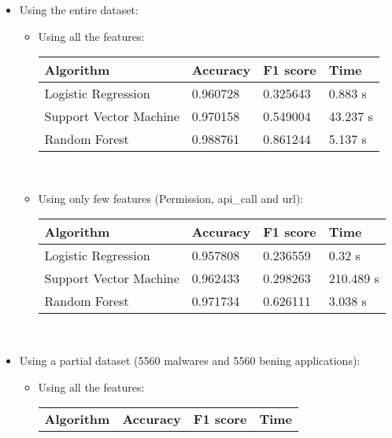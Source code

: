 \documentclass[11pt]{article}
\begin{document}
\begin{itemize}
	\item Using the entire dataset:
	\begin{itemize}
		\item Using all the features: \\ 
		\newline
		\renewcommand\arraystretch{1.5}
		\begin{tabular}{|p{4.5cm}|p{2cm}|p{2cm}|p{2cm}|}
			\hline
			\textbf{Algorithm} & \textbf{Accuracy} & \textbf{F1 score} & \textbf{Time}\\
			\hline
			Logistic Regression & 0.960728 & 0.325643 & 0.883 s \\
			\hline
			Support Vector Machine & 0.970158 & 0.549004 & 43.237 s \\
			\hline
			Random Forest & 0.988761 & 0.861244 & 5.137 s \\
			\hline
		\end{tabular}
		\renewcommand\arraystretch{1} \\
		\item Using only few features (Permission, api\_call and url): \\
		\newline
		\renewcommand\arraystretch{1.5}
		\begin{tabular}{|p{4.5cm}|p{2cm}|p{2cm}|p{2cm}|}
			\hline
			\textbf{Algorithm} & \textbf{Accuracy} & \textbf{F1 score} & \textbf{Time}\\
			\hline
			Logistic Regression & 0.957808 & 0.236559 & 0.32 s \\
			\hline
			Support Vector Machine & 0.962433 & 0.298263 & 210.489 s \\
			\hline
			Random Forest & 0.971734 & 0.626111 & 3.038 s \\
			\hline
		\end{tabular}
		\renewcommand\arraystretch{1} \\
	\end{itemize}
	\item Using a partial dataset (5560 malwares and 5560 bening applications):
	\begin{itemize}
		\item Using all the features: \\
		\newline
		\renewcommand\arraystretch{1.5}
		\begin{tabular}{|p{4.5cm}|p{2cm}|p{2cm}|p{2cm}|}
			\hline
			\textbf{Algorithm} & \textbf{Accuracy} & \textbf{F1 score} & \textbf{Time}\\

\end{tabular}
\end{itemize}
\end{itemize}
\end{document}
